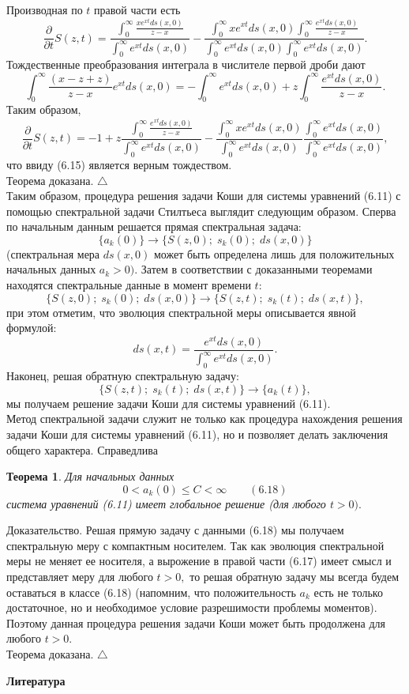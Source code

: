 \documentclass[12pt,a4paper]{article}
\theoremstyle{plain}   \newtheorem{Pro}{Задача}
\newtheorem{The}{Теорема}
\begin{document}
Производная по
$ t $
правой части есть
$$
  \frac{\partial}{\partial t}S(z,t)=
    \frac{\int _0 ^{\infty}
	  \frac{xe^{xt}ds(x,0)}{z-x}}
	{\int _0 ^{\infty} e^{xt}ds(x,0)}-
  \frac{\int _0 ^{\infty}xe^{xt}ds(x,0)
    \int _0 ^{\infty} \frac{e^{xt}ds(x,0)}{z-x}}
	{\int _0 ^{\infty}e^{xt}ds(x,0)
	  \int _0 ^{\infty}e^{xt}ds(x,0)}.
$$
Тождественные преобразования интеграла в числителе
первой дроби дают
$$
  \int _0 ^{\infty}\frac{(x-z+z)}{z-x}e^{xt}ds(x,0)=-
    \int _0 ^{\infty}e^{xt}ds(x,0)+z
	  \int _0 ^{\infty}\frac{e^{xt}ds(x,0)}{z-x}.
$$
Таким образом,
$$
  \frac{\partial}{\partial t}S(z,t)=-1+z\frac
    {\int _0 ^{\infty}\frac{e^{xt}ds(x,0)}{z-x}}
	{\int _0 ^{\infty} e^{xt}ds(x,0)}-
	  \frac{\int _0 ^{\infty}x e^{xt}ds(x,0)}
	  {\int _0 ^{\infty} e^{xt}ds(x,0)}
	    \frac{\int _0 ^{\infty}e^{xt}ds(x,0)}
		{\int _0 ^{\infty} e^{xt}ds(x,0)} ,
$$
что ввиду (6.15) является верным тождеством. \\
Теорема доказана.
$ \triangle $ \\
Таким образом, процедура решения задачи Коши
для системы уравнений (6.11)
с помощью спектральной задачи Стилтьеса
выглядит следующим образом.
Сперва по начальным данным решается прямая спектральная
задача:
$$
  \{ a_k (0) \} \longrightarrow
    \{ S(z,0); \; s_k (0); \; ds(x,0) \}
$$
(спектральная мера
$ ds(x,0) $
может быть определена лишь для положительных начальных данных
$ a_k >0 ). $
Затем в соответствии с доказанными теоремами находятся
спектральные данные в момент времени
$ t : $
$$
  \{ S(z,0); \; s_k (0); \; ds(x,0) \}
    \longrightarrow
	  \{ S(z,t); \; s_k (t); \; ds(x,t) \} ,
$$
при этом отметим, что эволюция спектральной меры описывается
явной формулой:
$$
  ds(x,t)=\frac{e^{xt}ds(x,0)}
    {\int _0 ^{\infty} e^{xt} ds(x,0)}.
$$
Наконец, решая обратную спектральную задачу:
$$
  \{ S(z,t); \; s_k (t); \; ds(x,t) \}
    \longrightarrow
	  \{ a_k (t) \} ,
$$
мы получаем решение задачи Коши для системы уравнений (6.11). \\
Метод спектральной задачи служит не только как процедура нахождения
решения задачи Коши для системы уравнений (6.11), но и позволяет
делать заключения общего характера. Справедлива
\begin{The}
Для начальных данных
$$
  0<a_k (0) \leqslant C < \infty
    \qquad (6.18)
$$
система уравнений (6.11) имеет глобальное решение
(для любого
$ t>0 ). $
\end{The}
{\Large Доказательство.}
Решая прямую задачу с данными (6.18) мы получаем спектральную меру
с компактным носителем. Так как эволюция спектральной меры
не меняет ее носителя, а вырожение в правой части (6.17)
имеет смысл и представляет меру для любого
$ t>0 , $
то решая обратную задачу мы всегда будем оставаться в классе
(6.18) (напомним, что положительность
$ a_k $
есть не только достаточное, но и необходимое условие
разрешимости проблемы моментов). Поэтому данная процедура
решения задачи Коши может быть продолжена для любого
$ t>0 . $ \\
Теорема доказана.
$ \triangle $
\newpage
\begin{center}
{\bfseries Литература}
\end{center}
$$ \; $$
\\
\end{document}
